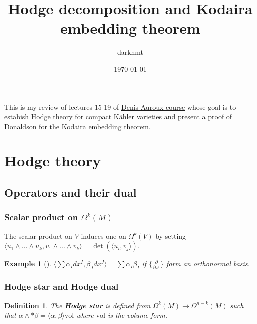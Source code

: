 \documentclass[11pt]{article}
\author{darknmt}
\date{\today}
\title{Hodge decomposition and Kodaira embedding theorem}
\newtheorem{exampl}{Example}
\newtheorem{definition}{Definition}
\begin{document}
\maketitle
\tableofcontents

\iffalse
\begin{info}
The PDF version of this page can be downloaded by replacing \texttt{html} in the its address by
\texttt{pdf}. 
For example \texttt{/html/sheaf-cohomology.html} should become \texttt{/pdf/sheaf-cohomology.pdf}.
\end{info}
\fi

This is my review of lectures 15-19 of \href{https://ocw.mit.edu/courses/mathematics/18-966-geometry-of-manifolds-spring-2007/index.htm}{Denis Auroux course} whose goal is to estabish Hodge
theory for compact Kähler varieties and present a proof of Donaldson for the Kodaira
embedding theorem.

\section{Hodge theory}
\label{sec:orgfb951a0}
\subsection{Operators and their dual}
\label{sec:org5e5d0ad}
\subsubsection{Scalar product on \(\Omega^k(M)\)}
\label{sec:orgd657c52}
The scalar product on \(V\) induces one on \(\Omega^k(V)\) by setting \(\langle u_1\wedge \dots \wedge u_k, v_1\wedge\dots \wedge v_k \rangle = \det(\langle
    u_i,v_j \rangle)\).
\begin{exampl}[]
\(\langle \sum \alpha_I dx^I, \beta_J dx^J \rangle =\sum \alpha_I \beta_I\) if \(\{\frac{\partial}{\partial x^i}\}\) form an orthonormal basis.
\end{exampl}
\subsubsection{Hodge star and Hodge dual}
\label{sec:orgc8dfe94}
\begin{definition}
The \textbf{Hodge star} is defined from \(\Omega^k(M) \longrightarrow \Omega^{n-k}(M)\)
such that \(\alpha \wedge *\beta = \langle \alpha, \beta \rangle \text{vol}\) where \(\text{vol}\) is the volume form.
\end{definition}
\end{document}
